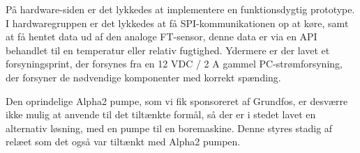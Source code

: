 
På hardware-siden er det lykkedes at implementere en funktionsdygtig prototype.
I hardwaregruppen er det lykkedes at få SPI-kommunikationen op at køre, samt at få hentet data ud af den analoge FT-sensor, denne data er via en API behandlet til en temperatur eller relativ fugtighed.
Ydermere er der lavet et forsyningsprint, der forsynes fra en 12 VDC / 2 A gammel PC-strømforsyning, der forsyner de nødvendige komponenter med korrekt spænding.

Den oprindelige Alpha2 pumpe, som vi fik sponsoreret af Grundfos, er desværre ikke mulig at anvende til det tiltænkte formål, så der er i stedet lavet en alternativ løsning, med en pumpe til en boremaskine. Denne styres stadig af relæet som det også var tiltænkt med Alpha2 pumpen. 

